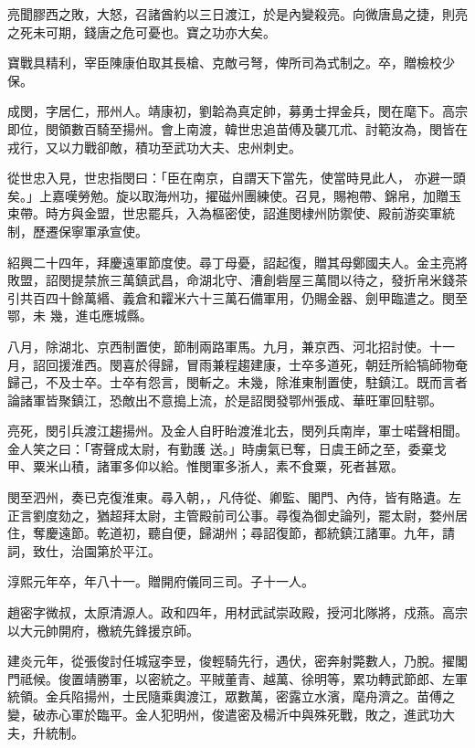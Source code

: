 \begin{pinyinscope}
 亮聞膠西之敗，大怒，召諸酋約以三日渡江，於是內變殺亮。向微唐島之捷，則亮
 之死未可期，錢唐之危可憂也。寶之功亦大矣。



 寶戰具精利，宰臣陳康伯取其長槍、克敵弓弩，俾所司為式制之。卒，贈檢校少保。



 成閔，字居仁，邢州人。靖康初，劉韐為真定帥，募勇士捍金兵，閔在麾下。高宗即位，閔領數百騎至揚州。會上南渡，韓世忠追苗傅及襲兀朮、討範汝為，閔皆在戎行，又以力戰卻敵，積功至武功大夫、忠州刺史。



 從世忠入見，世忠指閔曰：「臣在南京，自謂天下當先，使當時見此人，
 亦避一頭矣。」上嘉嘆勞勉。旋以取海州功，擢磁州團練使。召見，賜袍帶、錦帛，加贈玉束帶。時方與金盟，世忠罷兵，入為樞密使，詔進閔棣州防禦使、殿前游奕軍統制，歷遷保寧軍承宣使。



 紹興二十四年，拜慶遠軍節度使。尋丁母憂，詔起復，贈其母鄭國夫人。金主亮將敗盟，詔閔提禁旅三萬鎮武昌，命湖北守、漕創砦屋三萬間以待之，發折帛米錢茶引共百四十餘萬緡、義倉和糶米六十三萬石備軍用，仍賜金器、劍甲臨遣之。閔至鄂，未
 幾，進屯應城縣。



 八月，除湖北、京西制置使，節制兩路軍馬。九月，兼京西、河北招討使。十一月，詔回援淮西。閔喜於得歸，冒雨兼程趨建康，士卒多道死，朝廷所給犒師物奄歸己，不及士卒。士卒有怨言，閔斬之。未幾，除淮東制置使，駐鎮江。既而言者論諸軍皆聚鎮江，恐敵出不意搗上流，於是詔閔發鄂州張成、華旺軍回駐鄂。



 亮死，閔引兵渡江趨揚州。及金人自盱眙渡淮北去，閔列兵南岸，軍士喏聲相聞。金人笑之曰：「寄聲成太尉，有勤護
 送。」時虜氣已奪，日虞王師之至，委棄戈甲、粟米山積，諸軍多仰以給。惟閔軍多浙人，素不食粟，死者甚眾。



 閔至泗州，奏已克復淮東。尋入朝，，凡侍從、卿監、閣門、內侍，皆有賂遺。左正言劉度劾之，猶超拜太尉，主管殿前司公事。尋復為御史論列，罷太尉，婺州居住，奪慶遠節。乾道初，聽自便，歸湖州；尋詔復節，都統鎮江諸軍。九年，請詞，致仕，治園第於平江。



 淳熙元年卒，年八十一。贈開府儀同三司。子十一人。



 趙密字微叔，太原清源人。政和四年，用材武試崇政殿，授河北隊將，戍燕。高宗以大元帥開府，檄統先鋒援京師。



 建炎元年，從張俊討任城寇李昱，俊輕騎先行，遇伏，密奔射斃數人，乃脫。擢閣門祗候。俊置靖勝軍，以密統之。平賊董青、越萬、徐明等，累功轉武節郎、左軍統領。金兵陷揚州，士民隨乘輿渡江，眾數萬，密露立水濱，麾舟濟之。苗傅之變，破赤心軍於臨平。金人犯明州，俊遣密及楊沂中與殊死戰，敗之，進武功大夫，升統制。




\end{pinyinscope}
